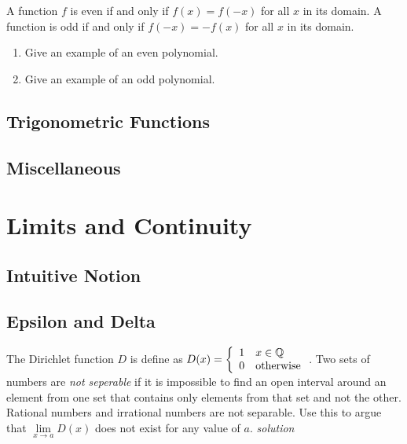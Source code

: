 \documentclass{amsbook}
\begin{document}
\begin{Exercise}[title={Polynomials II}, difficulty =0, label=1a3]
   A function $f$ is even if and only if $f(x)=f(-x)$ for all $x$ in its domain. A function is odd if and only if $f(-x)= - f(x)$ for all $x$ in its domain.
   	\begin{enumerate}
   		\item Give an example of an even polynomial.
   		\item Give an example of an odd polynomial.
   	\end{enumerate}
\end{Exercise}



\section{Trigonometric Functions}


\section{Miscellaneous}

\chapter{Limits and Continuity}


\section{Intuitive Notion}

\section{Epsilon and Delta}

\begin{Exercise}[title={Dirichlet Function}, difficulty=1 , label=2b1 ]
	The Dirichlet function $D$ is define as $D(x)=\left\{\begin{array}{c l} 1 & x\in \mathbb{Q} \\ 0 & \mbox{otherwise}\end{array} \right.$. Two sets of numbers are \emph{not seperable} if it is impossible to find an open interval around an element from one set that contains only elements from that set and not the other. Rational numbers and irrational numbers are not separable. Use this  to argue that $\lim \limits_{x\to a} D(x)$ does not exist for any value of $a$.
	\hfill \emph{solution} 
\end{Exercise}
\end{document}

